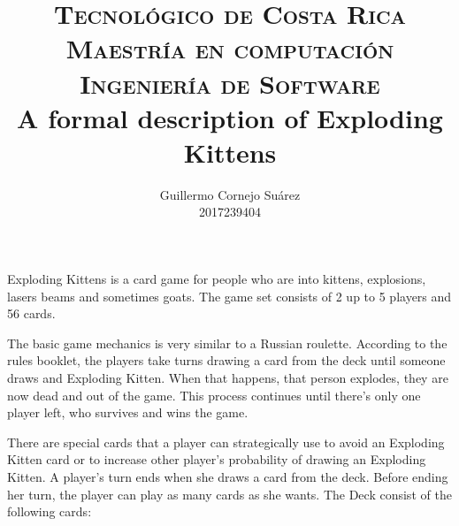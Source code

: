 \documentclass[11pt, fuzz]{article}
\title{		
		\usefont{OT1}{bch}{b}{n}
        \Large \textsc{Tecnológico de Costa Rica} \\
		\normalsize \textsc{Maestría en computación} \\ 
		\normalsize \textsc{Ingeniería de Software} \\ [25pt]		
		\Huge A formal description of Exploding Kittens \\	
}
\author{
		\normalfont \Large   Guillermo Cornejo Suárez \\ 		
        \large		 		 2017239404 \\ 		        
}
\begin{document}
\maketitle

Exploding Kittens is a card game for people who are into kittens, explosions, lasers beams and sometimes goats. The game set consists of 2 up to 5 players and 56 cards. 

The basic game mechanics is very similar to a Russian roulette. According to the rules booklet, the players take turns drawing a card from the deck until someone draws and Exploding Kitten. When that happens, that person explodes, they are now dead and out of the game. This process continues until there's only one player left, who survives and wins the game. 

There are special cards that a player can strategically use to avoid an Exploding Kitten card or to increase other player's probability of drawing an Exploding Kitten. A player's turn ends when she draws a card from the deck. Before ending her turn, the player can play as many cards as she wants. The Deck consist of the following cards: 
\end{document}
